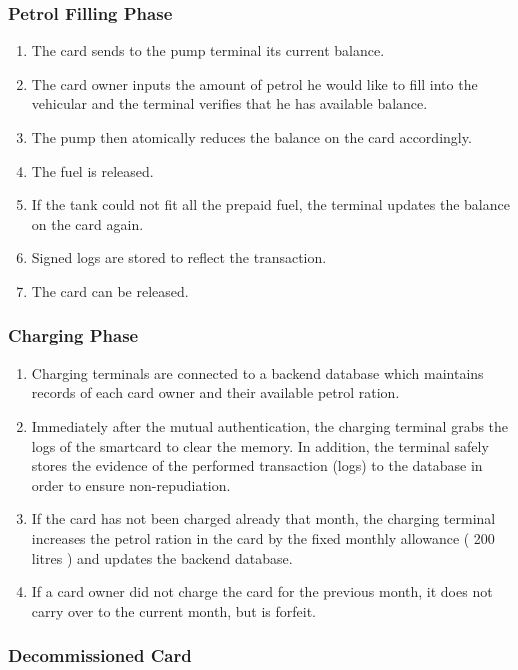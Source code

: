 \documentclass[a4paper,10pt]{llncs}
\begin{document}
\subsubsection{Petrol Filling Phase}
\begin{enumerate}
  \item The card sends to the pump terminal its current balance.
  \item The card owner inputs the amount of petrol he would like to fill into the vehicular and the terminal verifies that he has available balance.
  \item The pump then atomically reduces the balance on the card accordingly.
  \item The fuel is released.
  \item If the tank could not fit all the prepaid fuel, the terminal updates the balance on the card again.
  \item Signed logs are stored to reflect the transaction.
  \item The card can be released.
\end{enumerate}

\subsubsection{Charging Phase}
\begin{enumerate}
  \item Charging terminals are connected to a backend database which maintains records of each card owner and their available petrol ration.
  \item Immediately after the mutual authentication, the charging terminal grabs the logs of the smartcard to clear the memory.  In addition, the terminal safely stores the evidence of the performed transaction (logs) to the database in order to ensure non-repudiation.
  \item If the card has not been charged already that month, the charging terminal increases the petrol ration in the card by the fixed monthly allowance ( 200 litres ) and updates the backend database. 
  \item If a card owner did not charge the card for the previous month, it does not carry over to the current month, but is forfeit.
\end{enumerate}


\subsubsection{Decommissioned Card}
\end{document}
